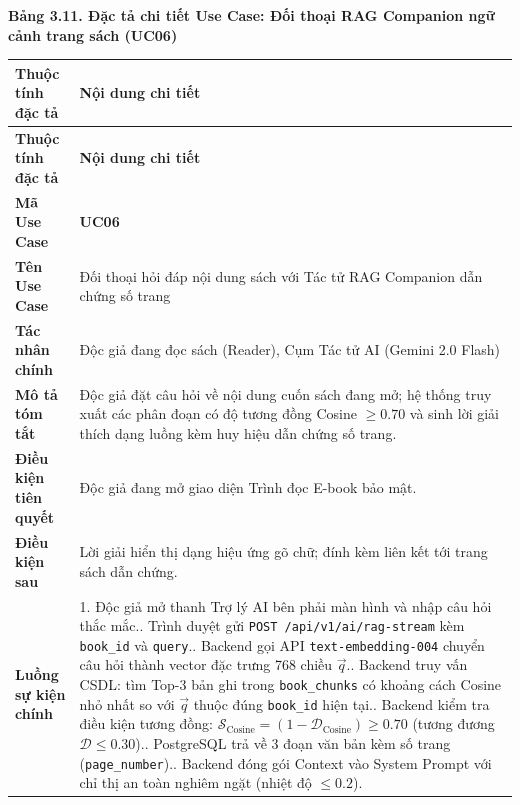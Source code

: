\documentclass[11pt, a4paper]{report}
\begin{document}
\vspace{0.3cm}
\noindent\textbf{Bảng 3.11. Đặc tả chi tiết Use Case: Đối thoại RAG Companion ngữ cảnh trang sách (UC06)}

\begin{longtable}{p{3.8cm} p{10.5cm}}
\toprule
\textbf{Thuộc tính đặc tả} & \textbf{Nội dung chi tiết} \\
\midrule
\endfirsthead
\toprule
\textbf{Thuộc tính đặc tả} & \textbf{Nội dung chi tiết} \\
\midrule
\endhead
\bottomrule
\endfoot
\textbf{Mã Use Case} & \textbf{UC06} \\
\midrule
\textbf{Tên Use Case} & Đối thoại hỏi đáp nội dung sách với Tác tử RAG Companion dẫn chứng số trang \\
\midrule
\textbf{Tác nhân chính} & Độc giả đang đọc sách (Reader), Cụm Tác tử AI (Gemini 2.0 Flash) \\
\midrule
\textbf{Mô tả tóm tắt} & Độc giả đặt câu hỏi về nội dung cuốn sách đang mở; hệ thống truy xuất các phân đoạn có độ tương đồng Cosine $\ge 0.70$ và sinh lời giải thích dạng luồng kèm huy hiệu dẫn chứng số trang. \\
\midrule
\textbf{Điều kiện tiên quyết} & Độc giả đang mở giao diện Trình đọc E-book bảo mật. \\
\midrule
\textbf{Điều kiện sau} & Lời giải hiển thị dạng hiệu ứng gõ chữ; đính kèm liên kết tới trang sách dẫn chứng. \\
\midrule
\textbf{Luồng sự kiện chính} & 
1. Độc giả mở thanh Trợ lý AI bên phải màn hình và nhập câu hỏi thắc mắc.\newline
2. Trình duyệt gửi \texttt{POST /api/v1/ai/rag-stream} kèm \texttt{book\_id} và \texttt{query}.\newline
3. Backend gọi API \texttt{text-embedding-004} chuyển câu hỏi thành vector đặc trưng 768 chiều $\vec{q}$.\newline
4. Backend truy vấn CSDL: tìm Top-3 bản ghi trong \texttt{book\_chunks} có khoảng cách Cosine nhỏ nhất so với $\vec{q}$ thuộc đúng \texttt{book\_id} hiện tại.\newline
5. Backend kiểm tra điều kiện tương đồng: $\mathcal{S}_{\text{Cosine}} = (1 - \mathcal{D}_{\text{Cosine}}) \ge 0.70$ (tương đương $\mathcal{D} \le 0.30$).\newline
6. PostgreSQL trả về 3 đoạn văn bản kèm số trang (\texttt{page\_number}).\newline
7. Backend đóng gói Context vào System Prompt với chỉ thị an toàn nghiêm ngặt (nhiệt độ $\le 0.2$).\newline

\end{longtable}
\end{document}
